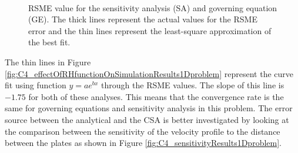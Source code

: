 \begin{figure}[H]
    \centering
    \\
    \caption{RSME value for the sensitivity analysis (SA) and governing equation (GE). The thick lines represent the actual values for the RSME error and the thin lines represent the least-square approximation of the best fit.}
    \label{fig:C4_effectOfNumberOfNodesOnSensitivityResults1Dproblem}
\end{figure}
%
The thin lines in Figure \ref{fig:C4_effectOfRHfunctionOnSimulationResults1Dproblem} represent the curve fit using function $y = ae^{bx}$ through the RSME values. The slope of this line is $-1.75$ for both of these analyses. This means that the convergence rate is the same for governing equations and sensitivity analysis in this problem. The error source between the analytical and the CSA is better investigated by looking at the comparison between the sensitivity of the velocity profile to the distance between the plates as shown in Figure \ref{fig:C4_sensitivityResults1Dproblem}.
%
